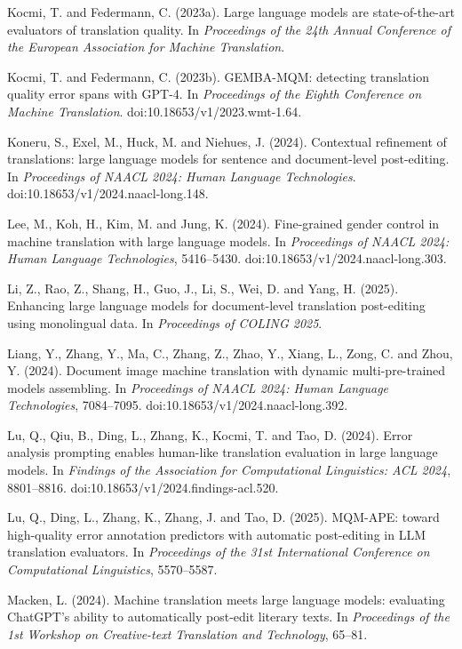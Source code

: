 \documentclass[11pt]{article}
\begin{document}
Kocmi, T. and Federmann, C. (2023a). Large language models are state-of-the-art evaluators of translation quality. In \emph{Proceedings of the 24th Annual Conference of the European Association for Machine Translation}.

Kocmi, T. and Federmann, C. (2023b). GEMBA-MQM: detecting translation quality error spans with GPT-4. In \emph{Proceedings of the Eighth Conference on Machine Translation}. doi:10.18653/v1/2023.wmt-1.64.

Koneru, S., Exel, M., Huck, M. and Niehues, J. (2024). Contextual refinement of translations: large language models for sentence and document-level post-editing. In \emph{Proceedings of NAACL 2024: Human Language Technologies}. doi:10.18653/v1/2024.naacl-long.148.

Lee, M., Koh, H., Kim, M. and Jung, K. (2024). Fine-grained gender control in machine translation with large language models. In \emph{Proceedings of NAACL 2024: Human Language Technologies}, 5416--5430. doi:10.18653/v1/2024.naacl-long.303.

Li, Z., Rao, Z., Shang, H., Guo, J., Li, S., Wei, D. and Yang, H. (2025). Enhancing large language models for document-level translation post-editing using monolingual data. In \emph{Proceedings of COLING 2025}.

Liang, Y., Zhang, Y., Ma, C., Zhang, Z., Zhao, Y., Xiang, L., Zong, C. and Zhou, Y. (2024). Document image machine translation with dynamic multi-pre-trained models assembling. In \emph{Proceedings of NAACL 2024: Human Language Technologies}, 7084--7095. doi:10.18653/v1/2024.naacl-long.392.

Lu, Q., Qiu, B., Ding, L., Zhang, K., Kocmi, T. and Tao, D. (2024). Error analysis prompting enables human-like translation evaluation in large language models. In \emph{Findings of the Association for Computational Linguistics: ACL 2024}, 8801--8816. doi:10.18653/v1/2024.findings-acl.520.

Lu, Q., Ding, L., Zhang, K., Zhang, J. and Tao, D. (2025). MQM-APE: toward high-quality error annotation predictors with automatic post-editing in LLM translation evaluators. In \emph{Proceedings of the 31st International Conference on Computational Linguistics}, 5570--5587.

Macken, L. (2024). Machine translation meets large language models: evaluating ChatGPT's ability to automatically post-edit literary texts. In \emph{Proceedings of the 1st Workshop on Creative-text Translation and Technology}, 65--81.
\end{document}
